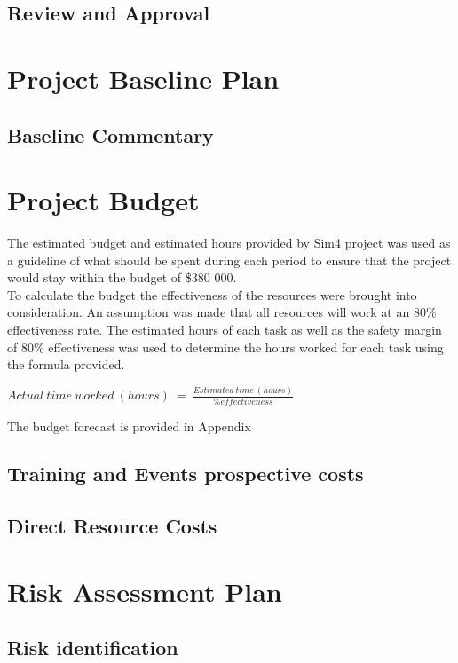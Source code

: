 \subsection{Review and Approval}

\section{Project Baseline Plan}
\subsection{Baseline Commentary}

\section{Project Budget}

The estimated budget and estimated hours provided by Sim4 project was used as a guideline of what should be spent during each period to ensure that the project would stay within the budget of \$380 000.\\

\noindent
To calculate the budget the effectiveness of the resources were brought into consideration. An assumption was made that all resources will work at an 80\% effectiveness rate. The estimated hours of each task as well as the safety margin of 80\% effectiveness was used to determine the hours worked for each task using the formula provided.\\

\begin{center}
$ Actual\ time\ worked\ (hours)\ =\ \frac{Estimated\ time\ (hours)}{\% effectiveness} $
\end{center}

The budget forecast is provided in Appendix 

\subsection{Training and Events prospective costs}
\subsection{Direct Resource Costs}

\section{Risk Assessment Plan}
\subsection{Risk identification}

